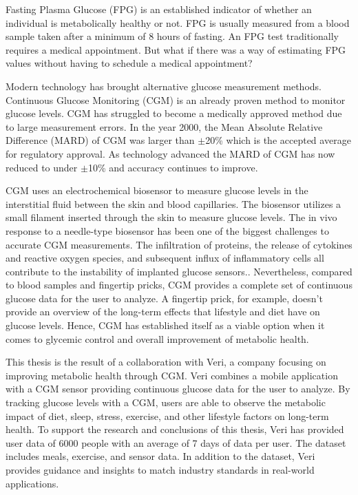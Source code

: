 \documentclass[english, 12pt, a4paper, elec, utf8, a-1b, online]{aaltothesis}
\begin{document}
Fasting Plasma Glucose (FPG) is an established indicator of whether 
an individual is metabolically healthy or not\cite{moebus_impact_2011}. 
FPG is usually measured from a blood sample taken after a minimum of 8 
hours of fasting\cite{the_expert_committee_on_the_diagnosis_and_classification_of_diabetes_mellitus_report_1997}. 
An FPG test traditionally requires a medical appointment. But what if there was a
way of estimating FPG values without having to schedule a medical 
appointment? 

Modern technology has brought alternative glucose measurement methods. 
Continuous Glucose Monitoring (CGM) is an already proven method to 
monitor glucose levels\cite{danne_international_2017}. CGM 
has struggled to become a medically approved method due to
large measurement errors. In the year 2000, the Mean Absolute Relative Difference
(MARD) of CGM was larger than $\pm$20\% which is the accepted average for 
regulatory approval. As technology advanced the MARD of CGM has 
now reduced to under $\pm$10\% and accuracy continues to improve\cite{rodbard_continuous_2016}\cite{ctx3255462370006526}.

CGM uses an electrochemical biosensor to measure glucose levels
in the interstitial fluid between the skin and blood capillaries.
The biosensor utilizes a small filament inserted through the skin 
to measure glucose levels. The in vivo response to a needle-type 
biosensor has been one of the biggest challenges to accurate CGM
measurements. The infiltration of proteins, the release of cytokines 
and reactive oxygen species, and subsequent influx of 
inflammatory cells all contribute to the instability of implanted 
glucose sensors.\cite{ctx3255462370006526}. Nevertheless, compared to
blood samples and fingertip pricks, CGM provides a complete set 
of continuous glucose data for the user to analyze. A fingertip
prick, for example, doesn't provide an overview of the long-term
effects that lifestyle and diet have on glucose levels. Hence, CGM
has established itself as a viable option when it comes to 
glycemic control and overall improvement of metabolic health. 

This thesis is the result of a collaboration 
with Veri\cite{noauthor_veri_nodate}, a company focusing on improving 
metabolic health through CGM. Veri combines a mobile application with a CGM 
sensor providing continuous glucose data for the user to analyze. By tracking 
glucose levels with a CGM, users are able to observe the metabolic impact
of diet, sleep, stress, exercise, and other lifestyle factors on long-term health. 
To support the research and conclusions of this thesis, Veri has 
provided user data of 6000 people with an average of 7 days of data 
per user. The dataset includes meals, exercise, and sensor data. 
In addition to the dataset, Veri provides guidance and insights to match
industry standards in real-world applications.
\end{document}
